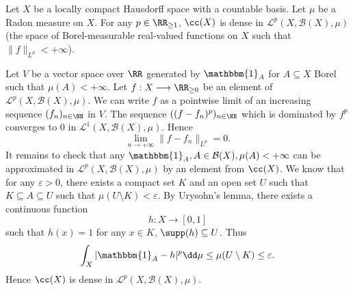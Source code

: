 \begin{lemmaenv}\label{lem:8.5.12}
    Let $X$ be a locally compact Hausdorff space with a countable basis.
    Let $\mu$ be a Radon measure on $X$.
    For any $p \in \RR_{\ge 1}$, $\cc(X)$ is dense in $\mathcal{L}^p(X,\mathcal{B}(X),\mu)$ (the space of Borel-measurable real-valued functions on $X$ such that $\|f\|_{L^p} < +\infty$).
\end{lemmaenv}
\begin{proofenv}
    Let $V$ be a vector space over $\RR$ generated by $\mathbbm{1}_{A}$ for $A \subseteq X$ Borel such that $\mu(A) < +\infty$.
    Let $f : X \longrightarrow \RR_{\ge 0}$ be an element of $\mathcal{L}^p(X,\mathcal{B}(X),\mu)$.
    We can write $f$ as a pointwise limit of an increasing sequence $(f_n)_{n \in \NN}$ in $V$.
    The sequence $((f-f_n)^p)_{n \in \NN}$ which is dominated by $f^p$ converges to $0$ in $\mathcal{L}^{1}(X,\mathcal{B}(X),\mu)$.
    Hence
    $$\lim_{n \rightarrow + \infty} \|f - f_n\|_{L^p} = 0.$$
    It remains to check that any $\mathbbm{1}_{A}, A \in \mathcal{B}(X),\mu(A) < +\infty$ can be approximated in $\mathcal{L}^{p}(X,\mathcal{B}(X),\mu)$ by an element from $\cc(X)$.
    We know that for any $\varepsilon > 0$, there exists a compact set $K$ and an open set $U$ such that $K \subseteq A \subseteq U$ such that $\mu(U \setminus K) < \varepsilon$.
    By Urysohn's lemma, there exists a continuous function
    $$h : X \longrightarrow [0,1]$$
    such that $h(x) = 1$ for any $x \in K$, $\supp(h) \subseteq U$.
    Thus
    $$\int_{X}|\mathbbm{1}_{A} - h|^p \dd \mu \le \mu(U \setminus K) \le \varepsilon.$$
    Hence $\cc(X)$ is dense in $\mathcal{L}^p(X,\mathcal{B}(X),\mu)$.
\end{proofenv}

